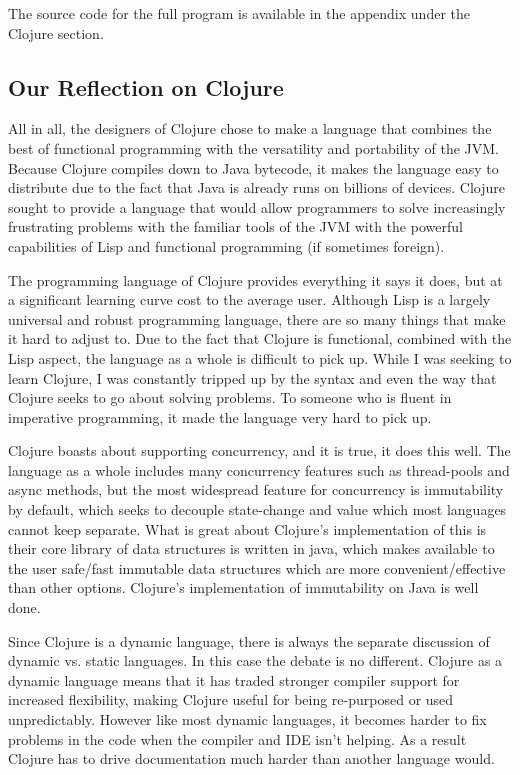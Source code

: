     The source code for the full program is available in the appendix under the Clojure section.
    
\subsection{Our Reflection on Clojure}

    All in all, the designers of Clojure chose to make a language that combines the best of functional programming with the versatility and portability of the JVM. Because Clojure compiles down to Java bytecode, it makes the language easy to distribute due to the fact that Java is already runs on billions of devices. Clojure sought to provide a language that would allow programmers to solve increasingly frustrating problems with the familiar tools of the JVM with the powerful capabilities of Lisp and functional programming (if sometimes foreign).
    
    The programming language of Clojure provides everything it says it does, but at a significant learning curve cost to the average user. Although Lisp is a largely universal and robust programming language, there are so many things that make it hard to adjust to. Due to the fact that Clojure is functional, combined with the Lisp aspect, the language as a whole is difficult to pick up. While I was seeking to learn Clojure, I was constantly tripped up by the syntax and even the way that Clojure seeks to go about solving problems. To someone who is fluent in imperative programming, it made the language very hard to pick up.
    
    Clojure boasts about supporting concurrency, and it is true, it does this well. The language as a whole includes many concurrency features such as thread-pools and async methods, but the most widespread feature for concurrency is immutability by default, which seeks to decouple state-change and value which most languages cannot keep separate. What is great about Clojure's implementation of this is their core library of data structures is written in java, which makes available to the user safe/fast immutable data structures which are more convenient/effective than other options. Clojure's implementation of immutability on Java is well done.
    
    Since Clojure is a dynamic language, there is always the separate discussion of dynamic vs. static languages. In this case the debate is no different. Clojure as a dynamic language means that it has traded stronger compiler support for increased flexibility, making Clojure useful for being re-purposed or used unpredictably. However like most dynamic languages, it becomes harder to fix problems in the code when the compiler and IDE isn't helping. As a result Clojure has to drive documentation much harder than another language would. 
    
